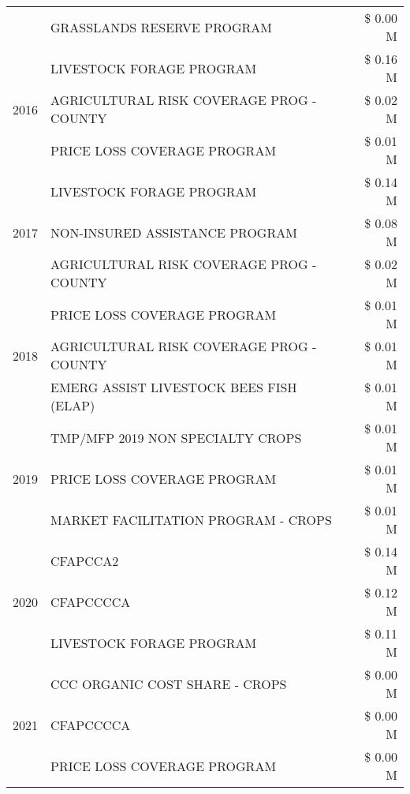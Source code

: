 \begin{tabular}{llr}
 & GRASSLANDS RESERVE PROGRAM & \$ 0.00 M \\
\cline{1-3}
\multirow[t]{3}{*}{2016} & LIVESTOCK FORAGE PROGRAM                      & \$ 0.16 M \\
 & AGRICULTURAL RISK COVERAGE PROG - COUNTY      & \$ 0.02 M \\
 & PRICE LOSS COVERAGE PROGRAM                   & \$ 0.01 M \\
\cline{1-3}
\multirow[t]{3}{*}{2017} & LIVESTOCK FORAGE PROGRAM & \$ 0.14 M \\
 & NON-INSURED ASSISTANCE PROGRAM & \$ 0.08 M \\
 & AGRICULTURAL RISK COVERAGE PROG - COUNTY & \$ 0.02 M \\
\cline{1-3}
\multirow[t]{3}{*}{2018} & PRICE LOSS COVERAGE PROGRAM & \$ 0.01 M \\
 & AGRICULTURAL RISK COVERAGE PROG - COUNTY & \$ 0.01 M \\
 & EMERG ASSIST LIVESTOCK BEES FISH (ELAP) & \$ 0.01 M \\
\cline{1-3}
\multirow[t]{3}{*}{2019} & TMP/MFP 2019 NON SPECIALTY CROPS & \$ 0.01 M \\
 & PRICE LOSS COVERAGE PROGRAM & \$ 0.01 M \\
 & MARKET FACILITATION PROGRAM - CROPS & \$ 0.01 M \\
\cline{1-3}
\multirow[t]{3}{*}{2020} & CFAPCCA2 & \$ 0.14 M \\
 & CFAPCCCCA & \$ 0.12 M \\
 & LIVESTOCK FORAGE PROGRAM & \$ 0.11 M \\
\cline{1-3}
\multirow[t]{3}{*}{2021} & CCC ORGANIC COST SHARE - CROPS & \$ 0.00 M \\
 & CFAPCCCCA & \$ 0.00 M \\
 & PRICE LOSS COVERAGE PROGRAM & \$ 0.00 M \\
\cline{1-3}
\bottomrule
\end{tabular}
